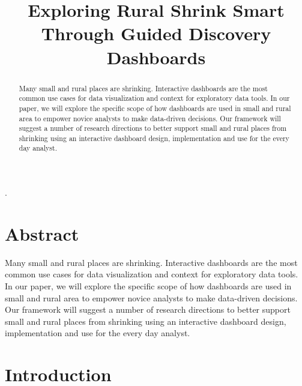 \documentclass[letterpaper,inpress]{jdsart}
\begin{document}
\begin{frontmatter}

\title{Exploring Rural Shrink Smart Through Guided Discovery Dashboards}


\author[1]{
      }
\author[1]{
    }

\address[1]{Department of Statistics, 
  , }

\begin{abstract}
Many small and rural places are shrinking. Interactive dashboards are the most common use cases for data visualization and context for exploratory data tools. In our paper, we will explore the specific scope of how dashboards are used in small and rural area to empower novice analysts to make data-driven decisions. Our framework will suggest a number of research directions to better support small and rural places from shrinking using an interactive dashboard design, implementation and use for the every day analyst.
\end{abstract}

\begin{keywords}
.
\end{keywords}

\end{frontmatter}

\hypertarget{abstract}{%
\section{Abstract}\label{abstract}}

Many small and rural places are shrinking. Interactive dashboards are the most common use cases for data visualization and context for exploratory data tools. In our paper, we will explore the specific scope of how dashboards are used in small and rural area to empower novice analysts to make data-driven decisions. Our framework will suggest a number of research directions to better support small and rural places from shrinking using an interactive dashboard design, implementation and use for the every day analyst.

\hypertarget{introduction}{%
\section{Introduction}\label{introduction}}
\end{document}
